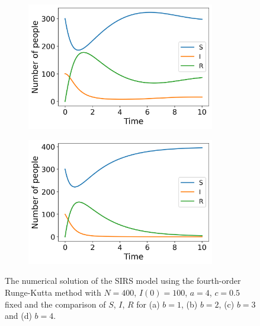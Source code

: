 \documentclass[../main.tex]{subfiles}
\begin{document}
\begin{figure}[htb!]
    \begin{subfigure}[b]{0.475\textwidth}
    \centering
    \includegraphics[width=0.9\textwidth]{../figures/SIRS_rk4_b=3.png}
    \caption{}
    \label{fig:b=3}
    \end{subfigure}
    \quad
    \begin{subfigure}[b]{0.475\textwidth}
    \includegraphics[width=0.9\textwidth]{../figures/SIRS_rk4_b=4.png}
    \caption{}
    \label{fig:b=4}
    \end{subfigure}
    \caption{The numerical solution of the SIRS model using the fourth-order Runge-Kutta method with $N=400$, $I(0)=100$, $a=4$, $c=0.5$ fixed and the comparison of $S$, $I$, $R$ for (a)  $b=1$, (b) $b=2$, (c) $b=3$ and (d) $b=4$.}
    \label{fig:SIRS_rk4}
\end{figure}
\end{document}
